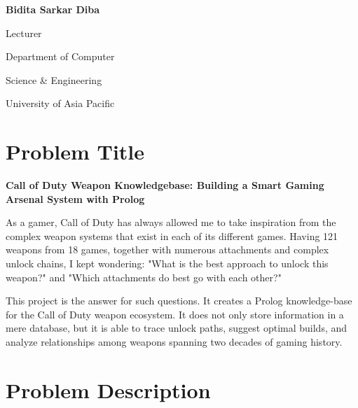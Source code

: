 \documentclass[12pt,a4paper]{article}
\begin{document}
\begin{titlepage}
\begin{minipage}[t]{0.45\textwidth}
        \vspace{0.5cm}

        {\large\bfseries Bidita Sarkar Diba}

        \vspace{0.3cm}

        {\large Lecturer}

        \vspace{0.3cm}

        {\large Department of Computer}

        \vspace{0.3cm}

        {\large Science \& Engineering}

        \vspace{0.3cm}

        {\large University of Asia Pacific}
    \end{minipage}

    \vfill

\end{titlepage}


\tableofcontents
\newpage

\setcounter{page}{1}

\section{Problem Title}

\textbf{Call of Duty Weapon Knowledgebase: Building a Smart Gaming Arsenal System with Prolog}

As a gamer, Call of Duty has always allowed me to take inspiration from the
complex weapon systems that exist in each of its different games. Having 121
weapons from 18 games, together with numerous attachments and complex unlock
chains, I kept wondering: "What is the best approach to unlock this weapon?"
and "Which attachments do best go with each other?"

This project is the answer for such questions. It creates a Prolog
knowledge-base for the Call of Duty weapon ecosystem. It does not only store
information in a mere database, but it is able to trace unlock paths, suggest
optimal builds, and analyze relationships among weapons spanning two decades of
gaming history.

\section{Problem Description}
\end{document}
